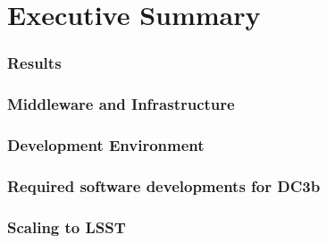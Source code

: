 \section*{Executive Summary}

\subsubsection*{Results}

\subsubsection*{Middleware and Infrastructure}

\subsubsection*{Development Environment}

\subsubsection*{Required software developments for DC3b}

\subsubsection*{Scaling to LSST}


